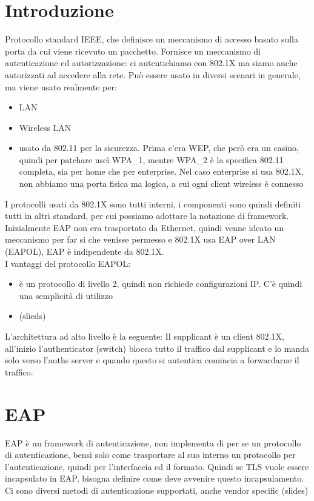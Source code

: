 \documentclass[12pt, oneside]{extbook} %
\begin{document}
\section{Introduzione}
Protocollo standard IEEE, che definisce un meccanismo di accesso basato sulla porta da cui viene ricevuto un pacchetto. Fornisce un meccanismo di autenticazione ed autorizzazione: ci autentichiamo con 802.1X ma siamo anche autorizzati ad accedere alla rete. Può essere usato in diversi scenari in generale, ma viene usato realmente per:
\begin{itemize}
\item LAN
\item Wireless LAN
\item usato da 802.11 per la sicurezza. Prima c'era WEP, che però era un casino, quindi per patchare uscì WPA\_1, mentre WPA\_2 è la specifica 802.11 completa, sia per home che per enterprise. Nel caso enterprise si usa 802.1X, non abbiamo una porta fisica ma logica, a cui ogni client wireless è connesso
\end{itemize}
I protocolli usati da 802.1X sono tutti interni, i componenti sono quindi definiti tutti in altri standard, per cui possiamo adottare la notazione di framework.\\ Inizialmente EAP non era trasportato da Ethernet, quindi venne ideato un meccanismo per far si che venisse permesso e 802.1X usa EAP over LAN (EAPOL), EAP è indipendente da 802.1X. \\ I vantaggi del protocollo EAPOL:
\begin{itemize}
\item è un protocollo di livello 2, quindi non richiede configurazioni IP. C'è quindi una semplicità di utilizzo
\item (slieds)
\end{itemize}
L'architettura ad alto livello è la seguente:
Il supplicant è un client 802.1X, all'inizio l'authenticator (switch) blocca tutto il traffico dal supplicant e lo manda solo verso l'auths server e quando questo si autentica comincia a forwardarne il traffico.
\section{EAP}
EAP è un framework di autenticazione, non implementa di per se un protocollo di autenticazione, bensì solo come trasportare al suo interno un protocollo per l'autenticazione, quindi per l'interfaccia ed il formato. Quindi se TLS vuole essere incapsulato in EAP, bisogna definire come deve avvenire questo incapsulamento.\\ Ci sono diversi metodi di autenticazione supportati, anche vendor specific
(slides)
\end{document}
